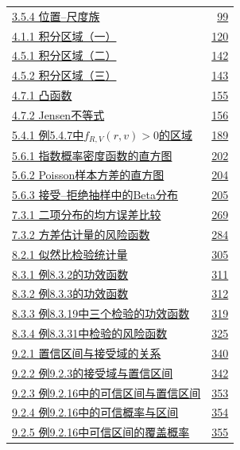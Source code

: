 \begin{longtable}{@{}p{}r@{}}
\hyperref[fig:3.5.4]{3.5.4 位置–尺度族} & \hyperref[fig:3.5.4]{99} \\
\hyperref[fig:4.1.1]{4.1.1 积分区域（一）} & \hyperref[fig:4.1.1]{120} \\
\hyperref[fig:4.5.1]{4.5.1 积分区域（二）} & \hyperref[fig:4.5.1]{142} \\
\hyperref[fig:4.5.2]{4.5.2 积分区域（三）} & \hyperref[fig:4.5.2]{143} \\
\hyperref[fig:4.7.1]{4.7.1 凸函数} & \hyperref[fig:4.7.1]{155} \\
\hyperref[fig:4.7.2]{4.7.2 Jensen不等式} & \hyperref[fig:4.7.2]{156} \\
\hyperref[fig:5.4.1]{5.4.1 例5.4.7中$f_{R,V}(r,v)>0$的区域} & \hyperref[fig:5.4.1]{189} \\
\hyperref[fig:5.6.1]{5.6.1 指数概率密度函数的直方图} & \hyperref[fig:5.6.1]{202} \\
\hyperref[fig:5.6.2]{5.6.2 Poisson样本方差的直方图} & \hyperref[fig:5.6.2]{204} \\
\hyperref[fig:5.6.3]{5.6.3 接受–拒绝抽样中的Beta分布} & \hyperref[fig:5.6.3]{205} \\
\hyperref[fig:7.3.1]{7.3.1 二项分布的均方误差比较} & \hyperref[fig:7.3.1]{269} \\
\hyperref[fig:7.3.2]{7.3.2 方差估计量的风险函数} & \hyperref[fig:7.3.2]{284} \\
\hyperref[fig:8.2.1]{8.2.1 似然比检验统计量} & \hyperref[fig:8.2.1]{305} \\
\hyperref[fig:8.3.1]{8.3.1 例8.3.2的功效函数} & \hyperref[fig:8.3.1]{311} \\
\hyperref[fig:8.3.2]{8.3.2 例8.3.3的功效函数} & \hyperref[fig:8.3.2]{312} \\
\hyperref[fig:8.3.3]{8.3.3 例8.3.19中三个检验的功效函数} & \hyperref[fig:8.3.3]{319} \\
\hyperref[fig:8.3.4]{8.3.4 例8.3.31中检验的风险函数} & \hyperref[fig:8.3.4]{325} \\
\hyperref[fig:9.2.1]{9.2.1 置信区间与接受域的关系} & \hyperref[fig:9.2.1]{340} \\
\hyperref[fig:9.2.2]{9.2.2 例9.2.3的接受域与置信区间} & \hyperref[fig:9.2.2]{342} \\
\hyperref[fig:9.2.3]{9.2.3 例9.2.16中的可信区间与置信区间} & \hyperref[fig:9.2.3]{353} \\
\hyperref[fig:9.2.4]{9.2.4 例9.2.16中的可信概率与区间} & \hyperref[fig:9.2.4]{354} \\
\hyperref[fig:9.2.5]{9.2.5 例9.2.16中可信区间的覆盖概率} & \hyperref[fig:9.2.5]{355} \\

\end{longtable}

